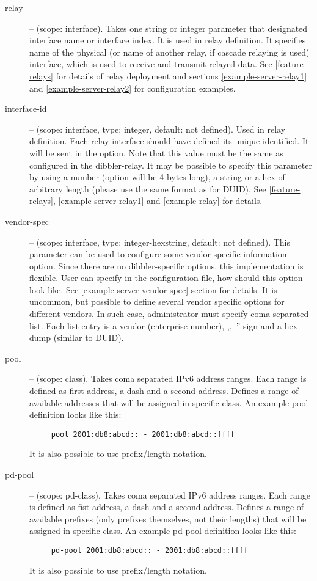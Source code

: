 \begin{description}
\item[relay] -- (scope: interface). Takes one string or integer
  parameter that designated interface name or interface index. It is
  used in relay definition.  It specifies name of the physical (or
  name of another relay, if cascade relaying is used) interface, which
  is used to receive and transmit relayed data. See
  \ref{feature-relays} for details of relay deployment and sections
  \ref{example-server-relay1} and \ref{example-server-relay2} for
  configuration examples.

\item[interface-id] -- (scope: interface, type: integer, default: not
  defined). Used in relay definition. Each relay interface should have
  defined its unique identified. It will be sent in the
   option. Note that this value must be the same as
  configured in the dibbler-relay. It may be possible to specify this
  parameter by using a number (option will be 4 bytes long), a string
  or a hex of arbitrary length (please use the same format as for
  DUID). See \ref{feature-relays}, \ref{example-server-relay1} and
  \ref{example-relay} for details.

 \item[vendor-spec] -- (scope: interface, type: integer-hexstring,
   default: not defined). This parameter can be used to configure some
   vendor-specific information option. Since there are no
   dibbler-specific options, this implementation is flexible. User can
   specify in the configuration file, how should this option look
   like. See \ref{example-server-vendor-spec} section for details. It
   is uncommon, but possible to define several vendor specific options
   for different vendors. In such case, administrator must specify
   coma separated list. Each list entry is a vendor (enterprise
   number), ,,--'' sign and a hex dump (similar to DUID).

 \item[pool] -- (scope: class). Takes coma separated IPv6 address
   ranges. Each range is defined as first-address, a dash and a second
   address. Defines a range of available addresses that will be
   assigned in specific class. An example pool definition looks like
   this:
   \begin{lstlisting}
     pool 2001:db8:abcd:: - 2001:db8:abcd::ffff
   \end{lstlisting}
   It is also possible to use prefix/length notation.

 \item[pd-pool] -- (scope: pd-class). Takes coma separated IPv6
   address ranges. Each range is defined as fist-address, a dash and a
   second address. Defines a range of available prefixes (only
   prefixes themselves, not their lengths) that will be assigned in
   specific class. An example pd-pool definition looks like this:
   \begin{lstlisting}
     pd-pool 2001:db8:abcd:: - 2001:db8:abcd::ffff
   \end{lstlisting}
   It is also possible to use prefix/length notation.


\end{description}
